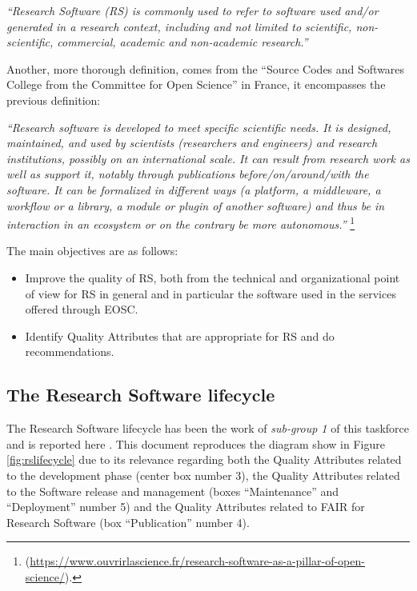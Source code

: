 \textit{``Research Software (RS) is commonly used to refer to software used and/or generated in a research context, including and not limited to scientific, non-scientific, commercial, academic and non-academic research.''}

Another, more thorough definition, comes from the ``Source Codes and Softwares College from the Committee for Open
Science'' in France, it encompasses the previous definition:

\textit{``Research software is developed to meet specific scientific needs. It is designed, maintained, and used by scientists (researchers and engineers) and research institutions, possibly on an international scale. It can result from research work as well as support it, notably through publications before/on/around/with the software. It can be formalized in different ways (a platform, a middleware, a workflow or a library, a module or plugin of another software) and thus be in interaction in an ecosystem or on the contrary be more autonomous.''} \footnote{(\url{https://www.ouvrirlascience.fr/research-software-as-a-pillar-of-open-science/}).}

\label{def_rs}

The main objectives are as follows:

\begin{itemize}
    \item Improve the quality of RS, both from the technical and organizational point of view for RS in general and in particular the software used in the services offered through EOSC.
    \item Identify Quality Attributes that are appropriate for RS and do recommendations.
\end{itemize}

\subsection{The Research Software lifecycle}

The Research Software lifecycle has been the work of \textit{sub-group 1} of this taskforce and is reported here \cite{sg1tf2023}. This document reproduces the diagram show in Figure \ref{fig:rslifecycle} due to its relevance regarding both the Quality Attributes related to the development phase (center box number 3), the Quality Attributes related to the Software release and management (boxes ``Maintenance'' and ``Deployment'' number 5) and the Quality Attributes related to FAIR for Research Software (box ``Publication'' number 4).

